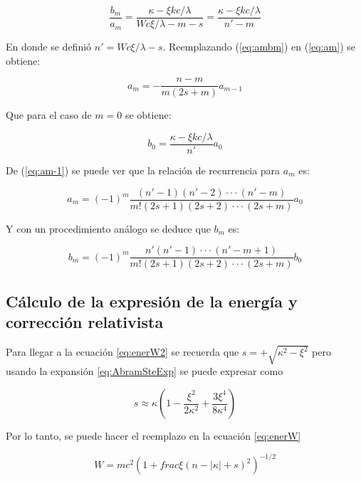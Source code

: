 \documentclass[a4paper, 12pt]{article} %
\begin{document}
\begin{equation}\label{eq:ambm}
\dfrac{b_m}{a_m} = \dfrac{\kappa - \xi kc/\lambda}{Wc\xi /\lambda - m - s} = \dfrac{\kappa - \xi kc/\lambda}{n'-m}
\end{equation} 

En donde se defini\'o $n' = Wc \xi /\lambda - s$. Reemplazando (\ref{eq:ambm}) en (\ref{eq:am}) se obtiene:

\begin{equation}\label{eq:am-1}
a_m = - \dfrac{n-m}{m(2s+m)}a_{m-1}
\end{equation} 

Que para el caso de $m=0$ se obtiene:

\begin{equation}
b_0 = \dfrac{\kappa - \xi kc/\lambda}{n'}a_0
\end{equation}

De (\ref{eq:am-1}) se puede ver que la relaci\'on de recurrencia para $a_m$ es:

\begin{equation}
a_m = (-1)^m \dfrac{(n'-1)(n'-2)\cdot\cdot\cdot(n'-m)}{m!(2s+1)(2s+2)\cdot\cdot\cdot(2s+m)}a_0
\end{equation} 

Y con un procedimiento an\'alogo se deduce que $b_m$ es:
 
\begin{equation}
b_m = (-1)^m \dfrac{n'(n'-1)\cdot\cdot\cdot (n'-m +1)}{m!(2s+1)(2s+2)\cdot\cdot\cdot(2s+m)}b_0
\end{equation}

\subsection{C\'alculo de la expresi\'on de la energ\'ia y correcci\'on relativista}

Para llegar a la ecuaci\'on \ref{eq:enerW2} se recuerda que $s=+\sqrt{\kappa^2-\xi^2}$ pero usando la expansi\'on \ref{eq:AbramSteExp} se puede expresar como 

\begin{equation}
s\approx \kappa \left( 1-\frac{\xi^2}{2\kappa^2}+\frac{3\xi^4}{8\kappa^4}  \right)
\end{equation}

Por lo tanto, se puede hacer el reemplazo en la ecuaci\'on \ref{eq:enerW}

\begin{equation}
W = mc^2 \left(1+frac{\xi}{(n-|\kappa|+s)^2} \right)^{-1/2}
\end{equation}
\end{document}
